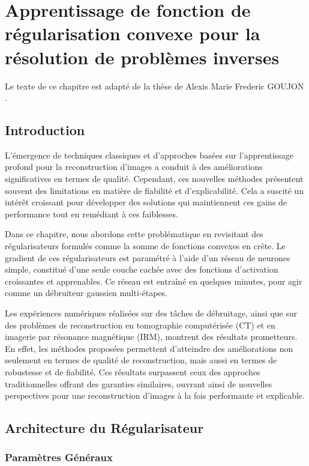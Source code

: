 \documentclass[a4paper, 12pt]{report} %
\begin{document}
\newpage

\chapter{Apprentissage de fonction de régularisation convexe pour la résolution de problèmes inverses}
Le texte de ce chapitre est adapté de la thèse de Alexis Marie Frederic GOUJON \cite{goujon2024towards}.

\section*{Introduction}

L'émergence de techniques classiques et d'approches basées sur l'apprentissage profond pour la reconstruction d'images a conduit à des améliorations significatives en termes de qualité. Cependant, ces nouvelles méthodes présentent souvent des limitations en matière de fiabilité  et d'explicabilité. Cela a suscité un intérêt croissant pour développer des solutions qui maintiennent ces gains de performance tout en remédiant à ces faiblesses.

Dans ce chapitre, nous abordons cette problématique en revisitant des régularisateurs formulés comme la somme de fonctions convexes en crête. Le gradient de ces régularisateurs est paramétré à l’aide d’un réseau de neurones simple, constitué d’une seule couche cachée avec des fonctions d’activation croissantes et apprenables. Ce réseau est entraîné en quelques minutes, pour agir comme un débruiteur gaussien multi-étapes.

Les expériences numériques réalisées sur des tâches de débruitage, ainsi que sur des problèmes de reconstruction en tomographie computérisée (CT) et en imagerie par résonance magnétique (IRM), montrent des résultats prometteurs. En effet, les méthodes proposées permettent d’atteindre des améliorations non seulement en termes de qualité de reconstruction, mais aussi en termes de robustesse et de fiabilité. Ces résultats surpassent ceux des approches traditionnelles offrant des garanties similaires, ouvrant ainsi de nouvelles perspectives pour une reconstruction d'images à la fois performante et explicable.

\section{Architecture du Régularisateur}
\subsection{Paramètres Généraux}
\end{document}
